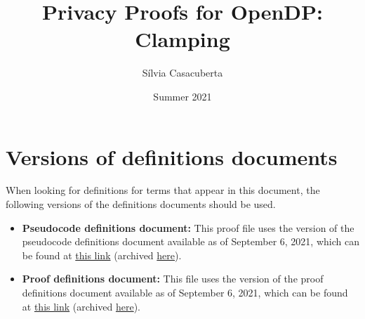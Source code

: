 

\title{Privacy Proofs for OpenDP: Clamping}
\author{S\'ilvia Casacuberta}
\date{Summer 2021}



\maketitle

\tableofcontents


\section{Versions of definitions documents}
\label{sec:versioned-docs}

When looking for definitions for terms that appear in this document, the following versions of the definitions documents should be used.

\begin{itemize}
    \item \textbf{Pseudocode definitions document:} This proof file uses the version of the pseudocode definitions document available as of September 6, 2021, which can be found at \href{https://github.com/opendp/whitepapers/blob/f8b279ab249934182f306138fa14e6390ddae3e9/pseudocode-defns/pseudocode_defns.pdf}{this link} (archived \href{https://web.archive.org/web/20210906201546/https://raw.githubusercontent.com/opendp/whitepapers/pseudocode-defns/pseudocode-defns/pseudocode_defns.pdf}{here}).
    
    \item \textbf{Proof definitions document:} This file uses the version of the proof definitions document available as of September 6, 2021, which can be found at \href{https://github.com/opendp/whitepapers/blob/d4c24e55cc37878634fec0b7f5c89259a3ad3ded/proof-defns/proof_defns.pdf}{this link} (archived \href{https://web.archive.org/web/20210906201056/https://raw.githubusercontent.com/opendp/whitepapers/proof-defns/proof-defns/proof_defns.pdf}{here}). 
\end{itemize}

